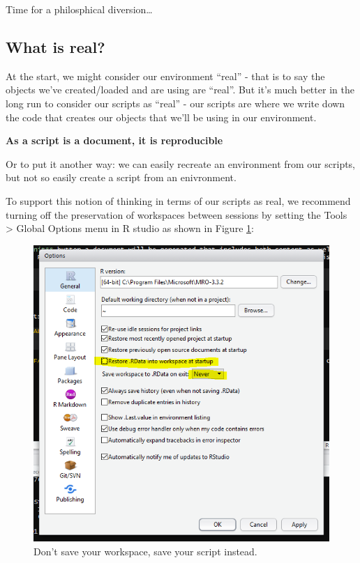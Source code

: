\documentclass[12pt,]{book}
\theoremstyle{definition}
\theoremstyle{definition}
\theoremstyle{definition}
\theoremstyle{remark}
\begin{document}
Time for a philosphical diversion\ldots{}

\subsection{What is real?}\label{what-is-real}

At the start, we might consider our environment ``real'' - that is to
say the objects we've created/loaded and are using are ``real''. But
it's much better in the long run to consider our scripts as ``real'' -
our scripts are where we write down the code that creates our objects
that we'll be using in our environment.

\textbf{As a script is a document, it is reproducible}

Or to put it another way: we can easily recreate an environment from our
scripts, but not so easily create a script from an enivronment.

To support this notion of thinking in terms of our scripts as real, we
recommend turning off the preservation of workspaces between sessions by
setting the Tools \textgreater{} Global Options menu in R studio as
shown in Figure \ref{fig:workspace}:



\begin{figure}

{\centering \includegraphics[width=0.8\linewidth]{img/rdata_turn_off} 

}

\caption{Don't save your workspace, save your script instead.}\label{fig:workspace}
\end{figure}
\end{document}
